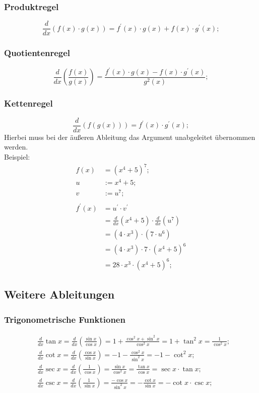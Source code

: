\documentclass[a4paper]{article}
\begin{document}
\subsubsection{Produktregel}
\[
	\frac{d}{dx} \left( f(x) \cdot g(x) \right) = f^\prime(x) \cdot g(x) + f(x) \cdot g^\prime(x) ;
\]

\subsubsection{Quotientenregel}
\[
	\frac{d}{dx} \left( \frac{f(x)}{g(x)} \right) = \frac{f^\prime(x) \cdot g(x) - f(x) \cdot g^\prime(x)}{ g^2(x) } ;
\]

\subsubsection{Kettenregel}
\[
	\frac{d}{dx} \left( f(g(x))  \right) = f^\prime(x) \cdot g^\prime(x) ;
\]
Hierbei muss bei der äußeren Ableitung das Argument unabgeleitet übernommen werden.
\\ Beispiel:
\begin{align*}
	f(x) &= (x^4 + 5)^7 ;
	\\
	u &:= x^4 + 5 ;
	\\
	v &:= u^7 ;
	\\
	\\
	f^\prime(x) &= u^\prime \cdot v^\prime
	\\
	&= \frac{d}{dx} \left( x^4 + 5 \right) \cdot \frac{d}{dx} \left( u^7 \right)
	\\
	&= (4 \cdot x^3) \cdot (7 \cdot u^6)
	\\
	&= (4 \cdot x^3) \cdot 7 \cdot (x^4 + 5)^6
	\\
	&= 28 \cdot x^3 \cdot (x^4 + 5)^6 ;
\end{align*}

\subsection{Weitere Ableitungen}

\subsubsection{Trigonometrische Funktionen}
\begin{align*}
	& \frac{d}{dx} \tan{x} = \frac{d}{dx} \left( \frac{\sin{x}}{\cos{x}} \right) = 1 + \frac{\cos^2{x} + \sin^2{x}}{\cos^2{x}} = 1 + \tan^2{x} = \frac{1}{\cos^2{x}};
	\\
	& \frac{d}{dx} \cot{x} = \frac{d}{dx} \left( \frac{\cos{x}}{\sin{x}} \right) = -1 - \frac{\cos^2{x}}{\sin^2{x}} = -1 - \cot^2{x};
	\\
	& \frac{d}{dx} \sec{x} = \frac{d}{dx} \left( \frac{1}{\cos{x}} \right) = \frac{\sin{x}}{\cos^2{x}} = \frac{\tan{x}}{\cos{x}} = \sec{x} \cdot \tan{x} ;
	\\
	& \frac{d}{dx} \csc{x} = \frac{d}{dx} \left( \frac{1}{\sin{x}} \right) = \frac{-\cos{x}}{\sin^2{x}} = -\frac{\cot{x}}{\sin{x}} = -\cot{x} \cdot \csc{x} ;
	\\
	&
\end{align*}
\end{document}
